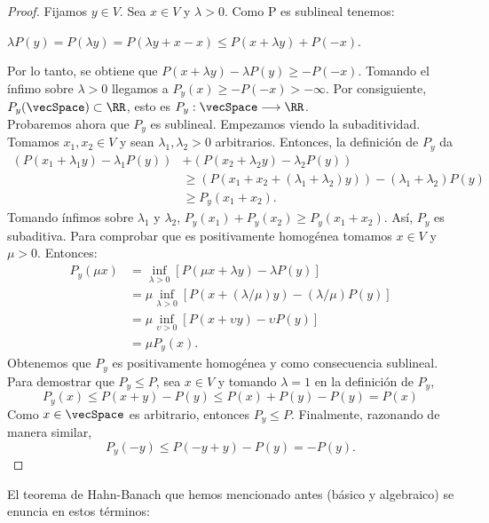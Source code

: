	\begin{proof}
		Fijamos $ y \in V $. Sea $ x \in V $ y $ \lambda > 0$. Como P es sublineal tenemos: 
		\begin{center}
			$ \lambda P(y) = P(\lambda y) =P(\lambda y +x-x) \leq P(x+\lambda y)+ P(-x)$.
		\end{center}
		Por lo tanto, se obtiene que $ P(x+\lambda y) - \lambda P(y) \geq -P(-x) $.  Tomando el ínfimo sobre $ \lambda >0 $ llegamos a $ P_{y}(x)\geq -P(-x) > -\infty$. Por consiguiente, $ P_y(\vecSpace) \subset \RR$, esto es $ P_y:\vecSpace \longrightarrow \RR $. \\
		
		Probaremos ahora que $ P_y $ es sublineal. Empezamos viendo la subaditividad. Tomamos $ x_1, x_2 \in V $ y sean $ \lambda_1, \lambda_2 > 0$ arbitrarios. Entonces, la definición de $ P_y $ da 
		\begin{equation*}
		\begin{split}
		( P(x_1 + \lambda_1 y) - \lambda_1 P(y) ) &+ ( P(x_2 + \lambda_2 y) - \lambda_2 P(y) ) \\
		& \geq ( P(x_1 + x_2 + (\lambda_1+\lambda_2)y)) - (\lambda_1+\lambda_2) P(y) \\
		&\geq P_y (x_1 + x_2 ).
		\end{split}
		\end{equation*}
		Tomando ínfimos sobre $ \lambda_1 $ y $ \lambda_2 $, $  P_y (x_1)  + P_y (x_2 ) \geq P_y (x_1 + x_2 ) $. Así, $ P_y $ es subaditiva. Para comprobar que es positivamente homogénea tomamos $ x \in V $ y $ \mu > 0 $. Entonces:
		\begin{equation*}
		\begin{split}
		P_y (\mu x) &= \inf_{\lambda > 0} \left[P(\mu x+\lambda y) - \lambda P(y)\right] \\
		&= \mu \inf_{\lambda > 0} \left[P(x+ (\lambda / \mu) y) - (\lambda / \mu) P(y)\right] \\
		&= \mu \inf_{\upsilon > 0} \left[P(x+ \upsilon y) - \upsilon  P(y)\right] \\
		&= \mu P_y (x).
		\end{split}
		\end{equation*}	
		Obtenemos que $ P_y $ es positivamente homogénea y como consecuencia sublineal. \\
		
		Para demostrar que $ P_y \leq P $, sea $ x \in V $ y tomando $ \lambda = 1 $ en la definición de $ P_y $,
		\[ P_y(x) \leq P(x+y) - P(y) \leq P(x)+ P(y) - P(y) = P(x) \]
		Como $ x \in \vecSpace $ es arbitrario, entonces $ P_y \leq P $. Finalmente, razonando de manera similar,
		\[P_y(-y) \leq P(-y+y) - P(y) = -P(y).  \]
		
	\end{proof}
\bigskip
El teorema de Hahn-Banach que hemos mencionado antes (básico y algebraico) se enuncia en estos términos:


